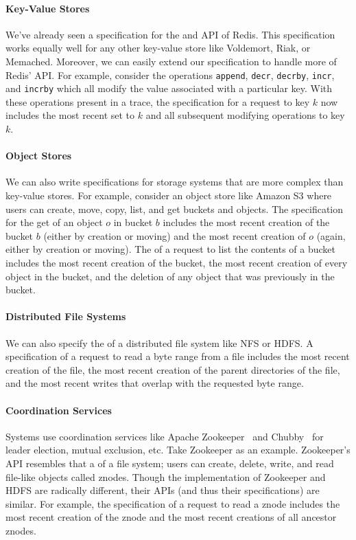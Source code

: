\paragraph{Key-Value Stores}
We've already seen a \watprovenance{} specification for the \kvget{} and
\kvset{} API of Redis. This specification works equally well for any other
key-value store like Voldemort, Riak, or Memached. Moreover, we can easily
extend our \watprovenance{} specification to handle more of Redis' API. For
example, consider the operations \texttt{append}, \texttt{decr},
\texttt{decrby}, \texttt{incr}, and \texttt{incrby} which all modify the value
associated with a particular key. With these operations present in a trace, the
\watprovenance{} specification for a \kvget{} request to key $k$ now includes
the most recent set to $k$ and all subsequent modifying operations to key $k$.

\paragraph{Object Stores}
We can also write \watprovenance{} specifications for storage systems that are
more complex than key-value stores. For example, consider an object store like
Amazon S3 where users can create, move, copy, list, and get buckets and
objects. The \watprovenance{} specification for the get of an object $o$ in
bucket $b$ includes the most recent creation of the bucket $b$ (either by
creation or moving) and the most recent creation of $o$ (again, either by
creation or moving). The \watprovenance{} of a request to list the contents of
a bucket includes the most recent creation of the bucket, the most recent
creation of every object in the bucket, and the deletion of any object that was
previously in the bucket.

\paragraph{Distributed File Systems}
We can also specify the \watprovenance{} of a distributed file system like NFS
or HDFS. A \watprovenance{} specification of a request to read a byte range
from a file includes the most recent creation of the file, the most recent
creation of the parent directories of the file, and the most recent writes that
overlap with the requested byte range.

\paragraph{Coordination Services}
Systems use coordination services like Apache
Zookeeper~\cite{hunt2010zookeeper} and Chubby~\cite{burrows2006chubby} for
leader election, mutual exclusion, etc. Take Zookeeper as an example.
Zookeeper's API resembles that a of a file system; users can create, delete,
write, and read file-like objects called znodes. Though the implementation of
Zookeeper and HDFS are radically different, their APIs (and thus their
\watprovenance{} specifications) are similar. For example, the \watprovenance{}
specification of a request to read a znode includes the most recent creation of
the znode and the most recent creations of all ancestor znodes.

